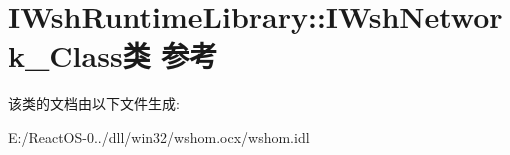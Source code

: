 \hypertarget{class_i_wsh_runtime_library_1_1_i_wsh_network___class}{}\section{I\+Wsh\+Runtime\+Library\+:\+:I\+Wsh\+Network\+\_\+\+Class类 参考}
\label{class_i_wsh_runtime_library_1_1_i_wsh_network___class}


该类的文档由以下文件生成\+:\begin{DoxyCompactItemize}
\item 
E\+:/\+React\+O\+S-\/0../dll/win32/wshom.\+ocx/wshom.\+idl\end{DoxyCompactItemize}
